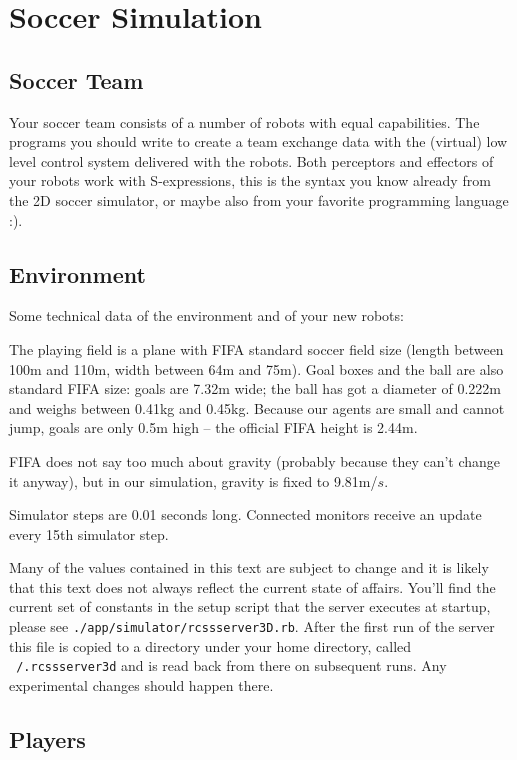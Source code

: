\section{Soccer Simulation}

\subsection{Soccer Team}

Your soccer team consists of a number of robots with equal
capabilities. The programs you should write to create a team exchange
data with the (virtual) low level control system delivered with the
robots. Both perceptors and effectors of your robots work with
S-expressions, this is the syntax you know already from the 2D soccer
simulator, or maybe also from your favorite programming language :).

\subsection{Environment}

Some technical data of the environment and of your new robots:

The playing field is a plane with FIFA standard soccer field size
(length between 100m and 110m, width between 64m and 75m).  Goal boxes
and the ball are also standard FIFA size: goals are 7.32m wide; the
ball has got a diameter of 0.222m and weighs between 0.41kg and
0.45kg.  Because our agents are small and cannot jump, goals are only
0.5m high -- the official FIFA height is 2.44m.

FIFA does not say too much about gravity (probably because they can't
change it anyway), but in our simulation, gravity is fixed to
9.81m/$s$.

Simulator steps are 0.01 seconds long. Connected monitors receive an
update every 15th simulator step.

Many of the values contained in this text are subject to change and it
is likely that this text does not always reflect the current state of
affairs. You'll find the current set of constants in the setup script
that the server executes at startup, please see
\texttt{./app/simulator/rcssserver3D.rb}. After the first run of the
server this file is copied to a directory under your home directory,
called \texttt{~/.rcssserver3d} and is read back from there on
subsequent runs. Any experimental changes should happen there.

\subsection{Players}

